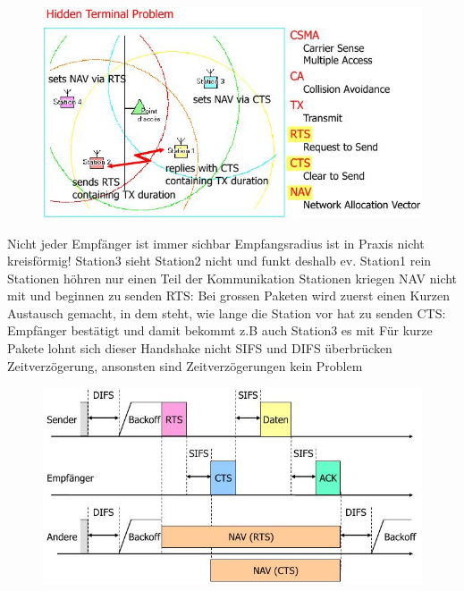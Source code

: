 \documentclass[ngerman,a4paper,12pt]{scrreprt}
\begin{document}
\begin{figure}[H]
	\centering
	 \includegraphics[width=\textwidth]{img/V6.6.jpg}
	\label{}
\end{figure}
\ul
	\li Nicht jeder Empfänger ist immer sichbar
	\li Empfangsradius ist in Praxis nicht kreisförmig!
	\li Station3 sieht Station2 nicht und funkt deshalb ev. Station1 rein
	\li Stationen höhren nur einen Teil der Kommunikation
	\li Stationen kriegen NAV nicht mit und beginnen zu senden
	\li RTS: Bei grossen Paketen wird zuerst einen Kurzen Austausch gemacht, in dem steht, wie lange die Station vor hat zu senden
	\li CTS: Empfänger bestätigt und damit bekommt z.B auch Station3 es mit
	\li Für kurze Pakete lohnt sich dieser Handshake nicht
	\li SIFS und DIFS überbrücken Zeitverzögerung, ansonsten sind Zeitverzögerungen kein Problem
\ulE
\begin{figure}[H]
	\centering
	 \includegraphics[width=\textwidth]{img/V6.7.jpg}
	\label{}
\end{figure}
\end{document}
